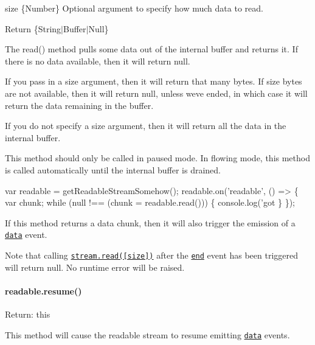 \begin{DoxyItemize}
\item {\ttfamily size} \{Number\} Optional argument to specify how much data to read.
\item Return \{String$\vert$\+Buffer$\vert$\+Null\}
\end{DoxyItemize}

The {\ttfamily read()} method pulls some data out of the internal buffer and returns it. If there is no data available, then it will return {\ttfamily null}.

If you pass in a {\ttfamily size} argument, then it will return that many bytes. If {\ttfamily size} bytes are not available, then it will return {\ttfamily null}, unless we\textquotesingle{}ve ended, in which case it will return the data remaining in the buffer.

If you do not specify a {\ttfamily size} argument, then it will return all the data in the internal buffer.

This method should only be called in paused mode. In flowing mode, this method is called automatically until the internal buffer is drained.


\begin{DoxyCode}
var readable = getReadableStreamSomehow();
readable.on('readable', () => \{
  var chunk;
  while (null !== (chunk = readable.read())) \{
    console.log('got %
  \}
\});
\end{DoxyCode}


If this method returns a data chunk, then it will also trigger the emission of a \href{#stream_event_data}{\tt {\ttfamily \textquotesingle{}data\textquotesingle{}}} event.

Note that calling \href{#stream_readable_read_size}{\tt {\ttfamily stream.\+read(\mbox{[}size\mbox{]})}} after the \href{#stream_event_end}{\tt {\ttfamily \textquotesingle{}end\textquotesingle{}}} event has been triggered will return {\ttfamily null}. No runtime error will be raised.

\paragraph*{readable.\+resume()}


\begin{DoxyItemize}
\item Return\+: {\ttfamily this}
\end{DoxyItemize}

This method will cause the readable stream to resume emitting \href{#stream_event_data}{\tt {\ttfamily \textquotesingle{}data\textquotesingle{}}} events.

